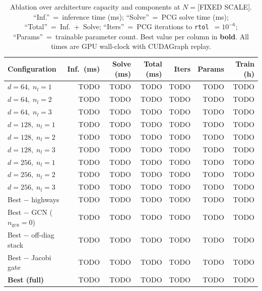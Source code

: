 \documentclass[acmtog,anonymous,review]{acmart}
\begin{document}
\begin{table}[h]
\centering
\caption{Ablation over architecture capacity and components at $N = $[FIXED SCALE].
``Inf.''~=~inference time (ms); ``Solve''~=~PCG solve time (ms); ``Total''~=~Inf.~+~Solve;
``Iters''~=~PCG iterations to \texttt{rtol}~$= 10^{-6}$; ``Params''~=~trainable parameter count.
Best value per column in \textbf{bold}.  All times are GPU wall-clock with CUDAGraph replay.}
\label{tab:ablation:arch}
\begin{tabular}{lrrrrrr}
\hline
Configuration & Inf.\ (ms) & Solve (ms) & Total (ms) & Iters & Params & Train (h) \\
\hline
$d{=}64,\;n_l{=}1$ & TODO & TODO & TODO & TODO & TODO & TODO \\
$d{=}64,\;n_l{=}2$ & TODO & TODO & TODO & TODO & TODO & TODO \\
$d{=}64,\;n_l{=}3$ & TODO & TODO & TODO & TODO & TODO & TODO \\
$d{=}128,\;n_l{=}1$ & TODO & TODO & TODO & TODO & TODO & TODO \\
$d{=}128,\;n_l{=}2$ & TODO & TODO & TODO & TODO & TODO & TODO \\
$d{=}128,\;n_l{=}3$ & TODO & TODO & TODO & TODO & TODO & TODO \\
$d{=}256,\;n_l{=}1$ & TODO & TODO & TODO & TODO & TODO & TODO \\
$d{=}256,\;n_l{=}2$ & TODO & TODO & TODO & TODO & TODO & TODO \\
$d{=}256,\;n_l{=}3$ & TODO & TODO & TODO & TODO & TODO & TODO \\
\hline
Best $-$ highways & TODO & TODO & TODO & TODO & TODO & TODO \\
Best $-$ GCN ($n_\mathrm{gcn}{=}0$) & TODO & TODO & TODO & TODO & TODO & TODO \\
Best $-$ off-diag stack & TODO & TODO & TODO & TODO & TODO & TODO \\
Best $-$ Jacobi gate & TODO & TODO & TODO & TODO & TODO & TODO \\
\textbf{Best (full)} & TODO & TODO & TODO & TODO & TODO & TODO \\
\hline
\end{tabular}
\end{table}

\end{document}
